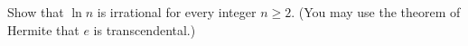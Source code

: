 Show that $\ln n$ is irrational for every integer $n\ge2$. (You may use the theorem of Hermite that $e$ is transcendental.)
